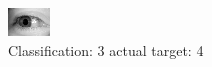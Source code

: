 \begin{figure}[h!]
\begin{center}
\includegraphics[width=0.60\columnwidth]{figures/ID3141_class_3_target_4.png}
\end{center}
\caption{ Classification: 3 actual target: 4}
\label{fig:ID3141_class_3_target_4}
\end{figure}
